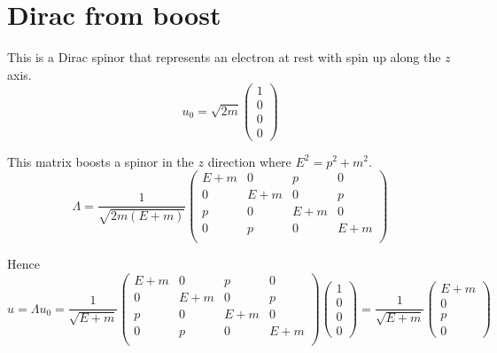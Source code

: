 



\section*{Dirac from boost}

This is a Dirac spinor that represents an electron at rest with spin up along the $z$ axis.
\begin{equation*}
u_0=\sqrt{2m}\begin{pmatrix}1\\0\\0\\0\end{pmatrix}
\end{equation*}

This matrix boosts a spinor in the $z$ direction where $E^2=p^2+m^2$.
\begin{equation*}
\Lambda=\frac{1}{\sqrt{2m(E+m)}}
\begin{pmatrix}
E+m & 0 & p & 0\\
0 & E+m & 0 & p\\
p & 0 & E+m & 0\\
0 & p & 0 & E+m\\
\end{pmatrix}
\end{equation*}

Hence
\begin{equation*}
u=\Lambda u_0=\frac{1}{\sqrt{E+m}}
\begin{pmatrix}
E+m & 0 & p & 0\\
0 & E+m & 0 & p\\
p & 0 & E+m & 0\\
0 & p & 0 & E+m\\
\end{pmatrix}
\begin{pmatrix}1\\0\\0\\0\end{pmatrix}
=\frac{1}{\sqrt{E+m}}\begin{pmatrix}E+m\\0\\p\\0\end{pmatrix}
\end{equation*}

